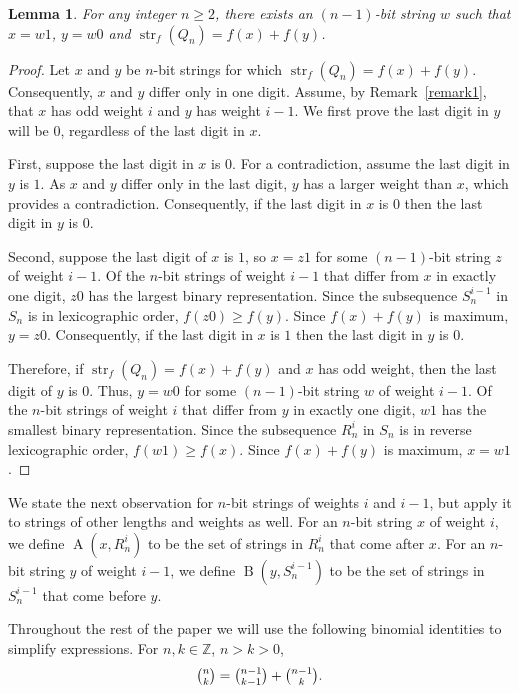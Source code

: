 \documentclass[12pt]{article}
\newtheorem{lemma}[theorem]{Lemma}
\DeclareMathOperator{\str}{str}
\DeclareMathOperator{\Succ}{A}
\DeclareMathOperator{\Prec}{B}
\begin{document}
\begin{lemma}\label{lem:ends} For any integer $n \geq 2$, there exists an $(n-1)$-bit string $w$ such that $x=w1$, $y=w0$ and $\str_f(Q_n) = f(x)+f(y)$.
\end{lemma}

\begin{proof} Let $x$ and $y$ be $n$-bit strings for which $\str_f(Q_n) = f(x)+f(y)$.  Consequently, $x$ and $y$ differ only in one digit. Assume, by Remark~\ref{remark1}, that $x$ has odd weight $i$ and $y$ has weight $i-1$.    We first prove the last digit in $y$ will be $0$, regardless of the last digit in $x$.

First, suppose the last digit in $x$ is $0$.  For a contradiction, assume the last digit in $y$ is $1$.  As $x$ and $y$ differ only in the last digit, $y$ has a larger weight than $x$, which provides a contradiction.  Consequently, if the last digit in $x$ is $0$ then the last digit in $y$ is $0$.

Second, suppose the last digit of $x$ is $1$, so $x=z1$ for some $(n-1)$-bit string $z$ of weight $i-1$. Of the $n$-bit strings of weight $i-1$ that differ from $x$ in exactly one digit, $z0$ has the largest binary representation. Since the subsequence $S_n^{i-1}$ in $S_n$ is in lexicographic order, $f(z0) \geq f(y)$.  Since $f(x)+f(y)$ is maximum, $y=z0$.  Consequently, if the last digit in $x$ is $1$ then the last digit in $y$ is $0$.

Therefore, if $\str_f(Q_n)=f(x)+f(y)$ and $x$ has odd weight, then the last digit of $y$ is $0$.  Thus, $y = w0$ for some $(n-1)$-bit string $w$ of weight $i-1$.  Of the $n$-bit strings of weight $i$ that differ from $y$ in exactly one digit, $w1$ has the smallest binary representation.  Since the subsequence $R_n^i$ in $S_n$ is in reverse lexicographic order, $f(w1) \geq f(x)$.  Since $f(x)+f(y)$ is maximum, $x=w1$.\end{proof} 

We state the next observation for $n$-bit strings of weights $i$ and $i-1$, but apply it to strings of other lengths and weights as well. For an $n$-bit string $x$ of weight $i$, we define $\Succ(x,R_n^i)$ to be the set of strings in $R_n^i$ that come after $x$.  For an $n$-bit string $y$ of  weight $i-1$, we define $\Prec(y,S_n^{i-1})$ to be the set of strings in $S_n^{i-1}$ that come before $y$.


Throughout the rest of the paper we will use the following binomial identities to simplify expressions. For $n, k \in \mathbb{Z}$, $n > k > 0$, 
\begin{equation}\label{Eq: Pascal's Triangle}
    \tbinom{n}{k} = \tbinom{n-1}{k-1} + \tbinom{n-1}{k}.
\end{equation}
\end{document}
